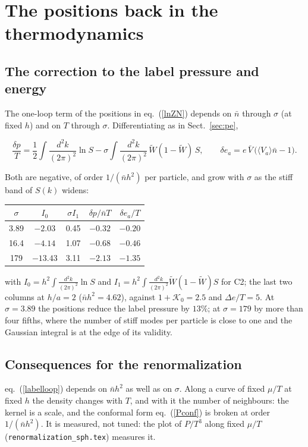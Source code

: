 \documentclass[11pt,aps,preprint,nofootinbib,superscriptaddress,tightenlines]{revtex4-2}
\newcommand{\avg}[1]{\langle #1\rangle}
\def\st{\begin{equation}}
\def\stp{\end{equation}}
\def\Eq#1{eq.~(\ref{#1})}
\def\Sect#1{Sect.~\ref{#1}}
\begin{document}
\section{The positions back in the thermodynamics}
\label{sec:back}

\subsection{The correction to the label pressure and energy}
\label{sec:loopcorr}

The one-loop term of the positions in \Eq{lnZN} depends on $\bar n$ through $\sigma$ (at fixed $h$) and on $T$ through $\sigma$.  Differentiating as in
\Sect{sec:pe},
\begin{keyeq}
\st
\frac{\delta p}T=\frac12\int\frac{d^2k}{(2\pi)^2}\ln S-\sigma\int\frac{d^2k}{(2\pi)^2}\,\widetilde W(1-\widetilde W)\,S,\qquad
\delta e_a=e\,\bar V\,\big(\avg{V_a}\bar n-1\big) .
\label{labelloop}
\stp
\end{keyeq}
Both are negative, of order $1/(\bar nh^2)$ per particle, and grow with $\sigma$ as the stiff band of $S(k)$ widens:
\begin{center}
\begin{tabular}{ccccc}
\toprule
$\sigma$ & $I_0$ & $\sigma I_1$ & $\delta p/\bar nT$ & $\delta e_a/T$ \\
\midrule
3.89 & $-2.03$ & 0.45 & $-0.32$ & $-0.20$ \\
16.4 & $-4.14$ & 1.07 & $-0.68$ & $-0.46$ \\
179 & $-13.43$ & 3.11 & $-2.13$ & $-1.35$ \\
\bottomrule
\end{tabular}
\end{center}
with $I_0=h^2\!\int\!\frac{d^2k}{(2\pi)^2}\ln S$ and $I_1=h^2\!\int\!\frac{d^2k}{(2\pi)^2}\widetilde W(1-\widetilde W)S$ for C2; the last two columns at $h/a=2$
($\bar nh^2=4.62$), against $1+\mathcal K_0=2.5$ and $\Delta e/T=5$.  At $\sigma=3.89$ the positions reduce the label pressure by $13\%$; at $\sigma=179$ by more
than four fifths, where the number of stiff modes per particle is close to one and the Gaussian integral is at the edge of its validity.

\subsection{Consequences for the renormalization}
\label{sec:loopren}

\Eq{labelloop} depends on $\bar nh^2$ as well as on $\sigma$.  Along a curve of fixed $\mu/T$ at fixed $h$ the density changes with $T$, and with it the number of
neighbours: the kernel is a scale, and the conformal form \Eq{Pconf} is broken at order $1/(\bar nh^2)$.  It is measured, not tuned: the plot of $P/T^3$
along fixed $\mu/T$ (\nolinkurl{renormalization_sph.tex}) measures it.
\end{document}
